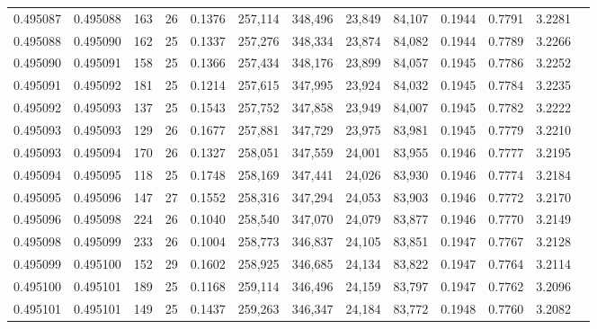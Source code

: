 \begin{tabular}{rrrrrrrrrrrrr}
0.495087 & 0.495088 & 163 &  26 &                                     0.1376 & 257,114 & 348,496 &  23,849 &  84,107 & 0.1944 & 0.7791 & 3.2281 \\
0.495088 & 0.495090 & 162 &  25 &                                     0.1337 & 257,276 & 348,334 &  23,874 &  84,082 & 0.1944 & 0.7789 & 3.2266 \\
0.495090 & 0.495091 & 158 &  25 &                                     0.1366 & 257,434 & 348,176 &  23,899 &  84,057 & 0.1945 & 0.7786 & 3.2252 \\
0.495091 & 0.495092 & 181 &  25 &                                     0.1214 & 257,615 & 347,995 &  23,924 &  84,032 & 0.1945 & 0.7784 & 3.2235 \\
0.495092 & 0.495093 & 137 &  25 &                                     0.1543 & 257,752 & 347,858 &  23,949 &  84,007 & 0.1945 & 0.7782 & 3.2222 \\
0.495093 & 0.495093 & 129 &  26 &                                     0.1677 & 257,881 & 347,729 &  23,975 &  83,981 & 0.1945 & 0.7779 & 3.2210 \\
0.495093 & 0.495094 & 170 &  26 &                                     0.1327 & 258,051 & 347,559 &  24,001 &  83,955 & 0.1946 & 0.7777 & 3.2195 \\
0.495094 & 0.495095 & 118 &  25 &                                     0.1748 & 258,169 & 347,441 &  24,026 &  83,930 & 0.1946 & 0.7774 & 3.2184 \\
0.495095 & 0.495096 & 147 &  27 &                                     0.1552 & 258,316 & 347,294 &  24,053 &  83,903 & 0.1946 & 0.7772 & 3.2170 \\
0.495096 & 0.495098 & 224 &  26 &                                     0.1040 & 258,540 & 347,070 &  24,079 &  83,877 & 0.1946 & 0.7770 & 3.2149 \\
0.495098 & 0.495099 & 233 &  26 &                                     0.1004 & 258,773 & 346,837 &  24,105 &  83,851 & 0.1947 & 0.7767 & 3.2128 \\
0.495099 & 0.495100 & 152 &  29 &                                     0.1602 & 258,925 & 346,685 &  24,134 &  83,822 & 0.1947 & 0.7764 & 3.2114 \\
0.495100 & 0.495101 & 189 &  25 &                                     0.1168 & 259,114 & 346,496 &  24,159 &  83,797 & 0.1947 & 0.7762 & 3.2096 \\
0.495101 & 0.495101 & 149 &  25 &                                     0.1437 & 259,263 & 346,347 &  24,184 &  83,772 & 0.1948 & 0.7760 & 3.2082 \\

\end{tabular}
